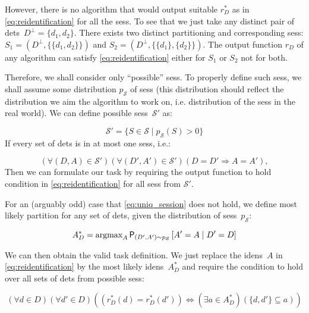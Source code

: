 However, there is no algorithm that would output suitable $r_D^*$ as in
\autoref{eq:reidentification} for all the \glspl{ses}. To see that we just take
any distinct pair of \glspl{det}~$D^\bot = \{d_1, d_2\}$. There exists two
distinct partitioning and corresponding \glspl{ses}:
$S_1 = (D^\bot, \{\{d_1, d_2\}\})$ and $S_2 = (D^\bot, \{\{d_1\}, \{d_2\}\})$.
The output function $r_D$ of any algorithm can satisfy
\autoref{eq:reidentification} either for $S_1$ or $S_2$ not for both.

Therefore, we shall consider only ``possible'' \glspl{ses}. To properly define
such \glspl{ses}, we shall assume some distribution $p_\mathcal{S}$ of
\glspl{ses} (this distribution should reflect the
distribution we aim the algorithm to work on, i.e. distribution of the
\glspl{ses} in the real world).
We can define possible \glspl{ses}~$\mathcal{S'}$ as:

$$\mathcal{S}' = \{S \in \mathcal{S} \mid p_\mathcal{S}(S) > 0\}$$
If every set of \glspl{det} is in at most one \glspl{ses}, i.e.:

\begin{equation}
    (\forall (D, A) \in \mathcal{S}')(\forall (D', A') \in \mathcal{S}') (D = D' \Rightarrow A = A'),
    \label{eq:uniq_session}
\end{equation}
Then we can formulate our task by requiring the output function to hold
condition in \autoref{eq:reidentification} for all
\glspl{ses} from $\mathcal{S}'$.

For an (arguably odd) case that \autoref{eq:uniq_session} does not hold, we
define most likely partition for any set of \glspl{det}, given the distribution
of \glspl{ses}~$p_\mathcal{S}$: 

\begin{equation}
A^*_D = \text{argmax}_A \operatorname{\textsf{P}}_{(D', A')\sim p_\mathcal{S}} \left[A' = A \mid D' = D\right]
\label{eq:mla}
\end{equation}

We can then obtain the valid task definition. We just replace the
\glspl{iden}~$A$ in \autoref{eq:reidentification} by the most likely
\glspl{iden}~$A_D^*$ and require the condition to hold over all sets of
\glspl{det} from possible \glspl{ses}:

\begin{equation}
(\forall d \in D) (\forall d' \in D) ((r_D^*(d) = r_D^*(d')) \Leftrightarrow (\exists a \in A_D^*) (\{d, d'\} \subseteq a))
\label{eq:formulation-final}
\end{equation}

